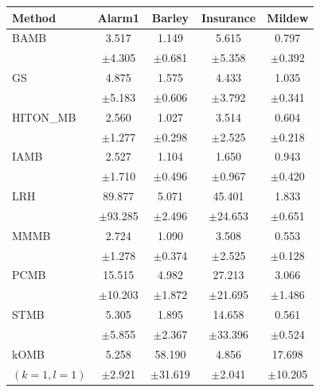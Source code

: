 \setlength{\tabcolsep}{5pt}
\begin{tabular}{lcccc}
\toprule
Method & Alarm1 & Barley & Insurance & Mildew \\
\midrule

BAMB
& 3.517 & 1.149 & 5.615 & 0.797 \\
& {\scriptsize $\pm$4.305} & {\scriptsize $\pm$0.681} & {\scriptsize $\pm$5.358} & {\scriptsize $\pm$0.392} \\

GS
& 4.875 & 1.575 & 4.433 & 1.035 \\
& {\scriptsize $\pm$5.183} & {\scriptsize $\pm$0.606} & {\scriptsize $\pm$3.792} & {\scriptsize $\pm$0.341} \\

HITON\_MB
& 2.560 & 1.027 & 3.514 & 0.604 \\
& {\scriptsize $\pm$1.277} & {\scriptsize $\pm$0.298} & {\scriptsize $\pm$2.525} & {\scriptsize $\pm$0.218} \\

IAMB
& 2.527 & 1.104 & 1.650 & 0.943 \\
& {\scriptsize $\pm$1.710} & {\scriptsize $\pm$0.496} & {\scriptsize $\pm$0.967} & {\scriptsize $\pm$0.420} \\

LRH
& 89.877 & 5.071 & 45.401 & 1.833 \\
& {\scriptsize $\pm$93.285} & {\scriptsize $\pm$2.496} & {\scriptsize $\pm$24.653} & {\scriptsize $\pm$0.651} \\

MMMB
& 2.724 & 1.090 & 3.508 & 0.553 \\
& {\scriptsize $\pm$1.278} & {\scriptsize $\pm$0.374} & {\scriptsize $\pm$2.525} & {\scriptsize $\pm$0.128} \\

PCMB
& 15.515 & 4.982 & 27.213 & 3.066 \\
& {\scriptsize $\pm$10.203} & {\scriptsize $\pm$1.872} & {\scriptsize $\pm$21.695} & {\scriptsize $\pm$1.486} \\

STMB
& 5.305 & 1.895 & 14.658 & 0.561 \\
& {\scriptsize $\pm$5.855} & {\scriptsize $\pm$2.367} & {\scriptsize $\pm$33.396} & {\scriptsize $\pm$0.524} \\

kOMB
& 5.258 & 58.190 & 4.856 & 17.698 \\
{\scriptsize $(k=1,l=1)$} & {\scriptsize $\pm$2.921} & {\scriptsize $\pm$31.619} & {\scriptsize $\pm$2.041} & {\scriptsize $\pm$10.205} \\


\end{tabular}
